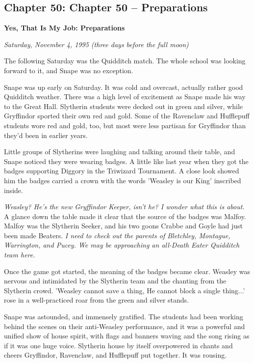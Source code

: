 \documentclass[a4paper,11pt]{article}
\begin{document}
\subsection{Chapter 50: Chapter 50 – Preparations}

\textbf{Yes, That Is My Job: Preparations}

\emph{Saturday, November 4, 1995 (three days before the full moon)}

The following Saturday was the Quidditch match. The whole school was looking forward to it, and Snape was no exception.

Snape was up early on Saturday. It was cold and overcast, actually rather good Quidditch weather. There was a high level of excitement as Snape made his way to the Great Hall. Slytherin students were decked out in green and silver, while Gryffindor sported their own red and gold. Some of the Ravenclaw and Hufflepuff students wore red and gold, too, but most were less partisan for Gryffindor than they'd been in earlier years.

Little groups of Slytherins were laughing and talking around their table, and Snape noticed they were wearing badges. A little like last year when they got the badges supporting Diggory in the Triwizard Tournament. A close look showed him the badges carried a crown with the words 'Weasley is our King' inscribed inside.

\emph{Weasley? He's the new Gryffindor Keeper, isn't he? I wonder what this is about.} A glance down the table made it clear that the source of the badges was Malfoy. Malfoy was the Slytherin Seeker, and his two goons Crabbe and Goyle had just been made Beaters. \emph{I need to check out the parents of Bletchley, Montague, Warrington, and Pucey. We may be approaching an all-Death Eater Quidditch team here.}

Once the game got started, the meaning of the badges became clear. Weasley was nervous and intimidated by the Slytherin team and the chanting from the Slytherin crowd. 'Weasley cannot save a thing, He cannot block a single thing...' rose in a well-practiced roar from the green and silver stands.

Snape was astounded, and immensely gratified. The students had been working behind the scenes on their anti-Weasley performance, and it was a powerful and unified show of house spirit, with flags and banners waving and the song rising as if it was one huge voice. Slytherin house by itself overpowered in chants and cheers Gryffindor, Ravenclaw, and Hufflepuff put together. It was rousing.
\end{document}
